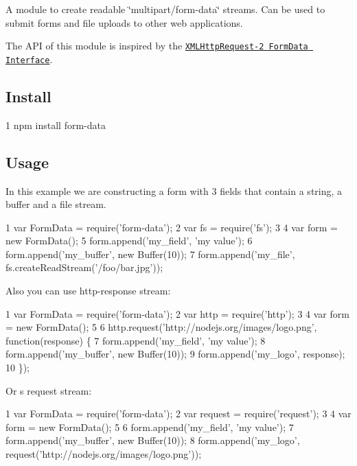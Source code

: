 A module to create readable {\ttfamily \char`\"{}multipart/form-\/data\char`\"{}} streams. Can be used to submit forms and file uploads to other web applications.

The A\+P\+I of this module is inspired by the \href{http://dev.w3.org/2006/webapi/XMLHttpRequest-2/Overview.html#the-formdata-interface}{\tt X\+M\+L\+Http\+Request-\/2 Form\+Data Interface}.

\subsection*{Install}


\begin{DoxyCode}
1 npm install form-data
\end{DoxyCode}


\subsection*{Usage}

In this example we are constructing a form with 3 fields that contain a string, a buffer and a file stream.


\begin{DoxyCode}
1 var FormData = require('form-data');
2 var fs = require('fs');
3 
4 var form = new FormData();
5 form.append('my\_field', 'my value');
6 form.append('my\_buffer', new Buffer(10));
7 form.append('my\_file', fs.createReadStream('/foo/bar.jpg'));
\end{DoxyCode}


Also you can use http-\/response stream\+:


\begin{DoxyCode}
1 var FormData = require('form-data');
2 var http = require('http');
3 
4 var form = new FormData();
5 
6 http.request('http://nodejs.org/images/logo.png', function(response) \{
7   form.append('my\_field', 'my value');
8   form.append('my\_buffer', new Buffer(10));
9   form.append('my\_logo', response);
10 \});
\end{DoxyCode}


Or \textquotesingle{}s request stream\+:


\begin{DoxyCode}
1 var FormData = require('form-data');
2 var request = require('request');
3 
4 var form = new FormData();
5 
6 form.append('my\_field', 'my value');
7 form.append('my\_buffer', new Buffer(10));
8 form.append('my\_logo', request('http://nodejs.org/images/logo.png'));
\end{DoxyCode}


